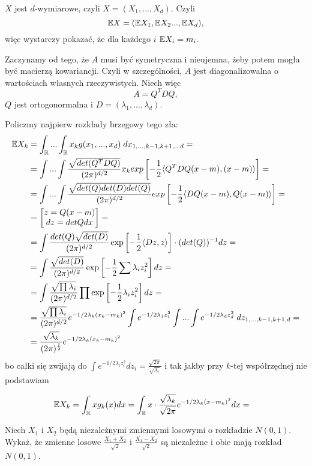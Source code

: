 \documentclass{article}
\begin{document}
$X$ jest $d$-wymiarowe, czyli $X=(X_1,...,X_d)$. Czyli
$$\mathbb{E} X=(\mathbb{E} X_1, \mathbb{E} X_2...,\mathbb{E} X_d),$$
więc wystarczy pokazać, że dla każdego $i$ $\mathbb{E} X_i=m_i$.

Zaczynamy od tego, że $A$ musi być symetryczna i nieujemna, żeby potem mogła być macierzą kowariancji. Czyli w szczególności, $A$ jest diagonalizowalna o wartościach własnych rzeczywistych. Niech więc
$$A=Q^TDQ,$$
$Q$ jest ortogonormalna i $D=(\lambda_1,...,\lambda_d)$.

Policzmy najpierw rozkłady brzegowy tego zła:
\begin{align*}
    \e X_k&=\int_\R...\int_\R x_kg(x_1,...,x_d)\;dx_{1,...,k-1,k+1,...d}=\\
    &=\int...\int\frac{\sqrt{det(Q^TDQ)}}{(2\pi)^{d/2}}x_kexp\left[-\frac{1}{2}\langle Q^TDQ(x-m),(x-m)\rangle\right]=\\
    &=\int...\int\frac{\sqrt{det(Q)det(D)det(Q)}}{(2\pi)^{d/2}}exp\left[-\frac{1}{2}\langle DQ(x-m),Q(x-m)\rangle\right]=\\
    &=\begin{bmatrix}z=Q(x-m)\\dz=detQdx\end{bmatrix}=\\
    &=\int \frac{det(Q)\sqrt{det(D)}}{(2\pi)^{d/2}}\exp\left[-\frac{1}{2}\langle Dz,z\rangle\right]\cdot(det(Q))^{-1}dz=\\
    &=\int\frac{\sqrt{det(D)}}{(2\pi)^{d/2}}\exp\left[-\frac{1}{2}\sum\lambda_iz_i^2\right]dz=\\
    &=\int\frac{\sqrt{\prod\lambda_i}}{(2\pi)^{d/2}}\prod\exp\left[-\frac{1}{2}\lambda_iz_i^2\right]dz=\\
    &=\frac{\sqrt{\prod\lambda_i}}{(2\pi)^{d/2}}e^{-1/2\lambda_k(x_k-m_k)^2}\int e^{-1/2\lambda_1z_1^2}\int...\int e^{-1/2\lambda_dz_d^2}\;dz_{1,...,k-1,k+1,d}=\\
    &=\frac{\sqrt{\lambda_k}}{(2\pi)^{\frac{1}{2}}}e^{-1/2\lambda_k(x_k-m_k)^2}%
\end{align*}
bo całki się zwijają do $\int e^{-1/2\lambda_iz_i^2}dz_i=\frac{\sqrt{2\pi}}{\sqrt{\lambda_i}}$ i tak jakby przy $k$-tej współrzędnej nie podstawiam

\begin{align*}
    \mathbb{E} X_k&=\int_{\mathbb{R}} xg_k(x)dx=\int_{\mathbb{R}} x\cdot\frac{\sqrt{\lambda_k}}{\sqrt{2\pi}}e^{-1/2\lambda_k(x-m_k)^2}dx=
\end{align*}

\begin{problem}{}
Niech $X_1$ i $X_2$ będą niezależnymi zmiennymi losowymi o rozkładzie $N(0,1)$. Wykaż, że zmienne losowe $\frac{X_1+X_2}{\sqrt{2}}$ i $\frac{X_1-X_2}{\sqrt{2}}$ są niezależne i obie mają rozkład $N(0,1)$.
\end{problem}
\end{document}
